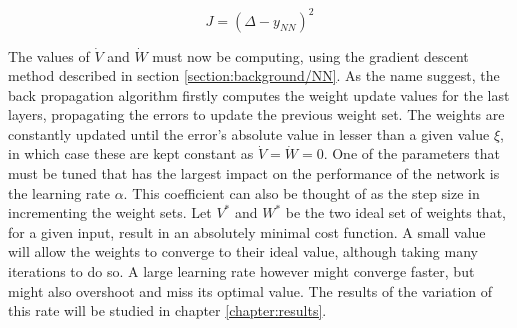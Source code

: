 \begin{equation}
J=(\Delta-y_{NN})^2
\label{eq:NN_cost}
\end{equation}

The values of $\dot{V}$ and $\dot{W}$ must now be computing, using the gradient descent method described in section \ref{section:background/NN}. As the name suggest, the back propagation algorithm firstly computes the weight update values for the last layers, propagating the errors to update the previous weight set. The weights are constantly updated until the error's absolute value in lesser than a given value $\xi$, in which case these are kept constant as $\dot{V}=\dot{W}=0$. 
One of the parameters that must be tuned that has the largest impact on the performance of the network is the learning rate $\alpha$. This coefficient can also be thought of as the step size in incrementing the weight sets. Let $V^*$ and $W^*$ be the two ideal set of weights that, for a given input, result in an absolutely minimal cost function. A small value will allow the weights to converge to their ideal value, although taking many iterations to do so. A large learning rate however might converge faster, but might also overshoot and miss its optimal value. The results of the variation of this rate will be studied in chapter \ref{chapter:results}.

